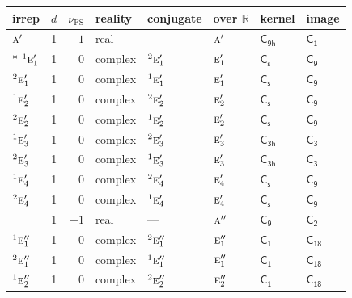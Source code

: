 \documentclass[10pt,a4paper]{article}
\numberwithin{equation}{section}
\newcommand{\grp}[1]{\mathsf{#1}}
\newcommand{\irr}[1]{\text{\normalfont\scshape #1}}
\newcommand{\conjpair}[1]{{}^{#1}}
\newcommand{\detbox}[1]{{\setlength{\fboxsep}{1pt}\fbox{#1}}}
\newcommand{\fsind}{\nu_{\mathrm{FS}}}
\begin{document}
{\small\renewcommand{\arraystretch}{1.25}\setlength{\tabcolsep}{4pt}\begin{longtable}{@{}lrrlllll@{}}\toprule
irrep & $d$ & $\fsind$ & reality & conjugate & over $\mathbb{R}$ & kernel & image\\\midrule\endhead
\bottomrule\endfoot\endlastfoot
$\irr{a}'$ & 1 & $+1$ & real & --- & $\irr{a}'$ & \href{C9h.pdf}{$\grp{C_{9h}}$} & \href{C1.pdf}{$\grp{C_{1}}$}\\*
$\conjpair{1}\irr{e}_{1}'$ & 1 & $0$ & complex & $\conjpair{2}\irr{e}_{1}'$ & $\irr{e}_{1}'$ & \href{C1v.pdf}{$\grp{C_{s}}$} & \href{C9.pdf}{$\grp{C_{9}}$}\\
$\conjpair{2}\irr{e}_{1}'$ & 1 & $0$ & complex & $\conjpair{1}\irr{e}_{1}'$ & $\irr{e}_{1}'$ & \href{C1v.pdf}{$\grp{C_{s}}$} & \href{C9.pdf}{$\grp{C_{9}}$}\\
$\conjpair{1}\irr{e}_{2}'$ & 1 & $0$ & complex & $\conjpair{2}\irr{e}_{2}'$ & $\irr{e}_{2}'$ & \href{C1v.pdf}{$\grp{C_{s}}$} & \href{C9.pdf}{$\grp{C_{9}}$}\\
$\conjpair{2}\irr{e}_{2}'$ & 1 & $0$ & complex & $\conjpair{1}\irr{e}_{2}'$ & $\irr{e}_{2}'$ & \href{C1v.pdf}{$\grp{C_{s}}$} & \href{C9.pdf}{$\grp{C_{9}}$}\\
$\conjpair{1}\irr{e}_{3}'$ & 1 & $0$ & complex & $\conjpair{2}\irr{e}_{3}'$ & $\irr{e}_{3}'$ & \href{C3h.pdf}{$\grp{C_{3h}}$} & \href{C3.pdf}{$\grp{C_{3}}$}\\
$\conjpair{2}\irr{e}_{3}'$ & 1 & $0$ & complex & $\conjpair{1}\irr{e}_{3}'$ & $\irr{e}_{3}'$ & \href{C3h.pdf}{$\grp{C_{3h}}$} & \href{C3.pdf}{$\grp{C_{3}}$}\\
$\conjpair{1}\irr{e}_{4}'$ & 1 & $0$ & complex & $\conjpair{2}\irr{e}_{4}'$ & $\irr{e}_{4}'$ & \href{C1v.pdf}{$\grp{C_{s}}$} & \href{C9.pdf}{$\grp{C_{9}}$}\\
$\conjpair{2}\irr{e}_{4}'$ & 1 & $0$ & complex & $\conjpair{1}\irr{e}_{4}'$ & $\irr{e}_{4}'$ & \href{C1v.pdf}{$\grp{C_{s}}$} & \href{C9.pdf}{$\grp{C_{9}}$}\\
\detbox{$\irr{a}''$} & 1 & $+1$ & real & --- & $\irr{a}''$ & \href{C9.pdf}{$\grp{C_{9}}$} & \href{C2.pdf}{$\grp{C_{2}}$}\\
$\conjpair{1}\irr{e}_{1}''$ & 1 & $0$ & complex & $\conjpair{2}\irr{e}_{1}''$ & $\irr{e}_{1}''$ & \href{C1.pdf}{$\grp{C_{1}}$} & $\grp{C_{18}}$\\
$\conjpair{2}\irr{e}_{1}''$ & 1 & $0$ & complex & $\conjpair{1}\irr{e}_{1}''$ & $\irr{e}_{1}''$ & \href{C1.pdf}{$\grp{C_{1}}$} & $\grp{C_{18}}$\\
$\conjpair{1}\irr{e}_{2}''$ & 1 & $0$ & complex & $\conjpair{2}\irr{e}_{2}''$ & $\irr{e}_{2}''$ & \href{C1.pdf}{$\grp{C_{1}}$} & $\grp{C_{18}}$\\

\end{longtable}}
\end{document}

